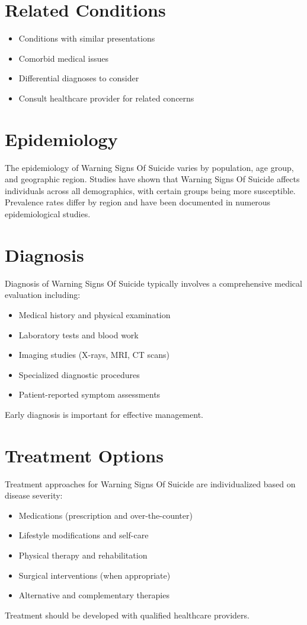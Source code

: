 \section*{Related Conditions}
\begin{itemize}
  \item Conditions with similar presentations
  \item Comorbid medical issues
  \item Differential diagnoses to consider
  \item Consult healthcare provider for related concerns
\end{itemize}

\section*{Epidemiology}
The epidemiology of Warning Signs Of Suicide varies by population, age group, and geographic region. Studies have shown that Warning Signs Of Suicide affects individuals across all demographics, with certain groups being more susceptible. Prevalence rates differ by region and have been documented in numerous epidemiological studies.

\section*{Diagnosis}
Diagnosis of Warning Signs Of Suicide typically involves a comprehensive medical evaluation including:
\begin{itemize}
  \item Medical history and physical examination
  \item Laboratory tests and blood work
  \item Imaging studies (X-rays, MRI, CT scans)
  \item Specialized diagnostic procedures
  \item Patient-reported symptom assessments
\end{itemize}
Early diagnosis is important for effective management.

\section*{Treatment Options}
Treatment approaches for Warning Signs Of Suicide are individualized based on disease severity:
\begin{itemize}
  \item Medications (prescription and over-the-counter)
  \item Lifestyle modifications and self-care
  \item Physical therapy and rehabilitation
  \item Surgical interventions (when appropriate)
  \item Alternative and complementary therapies
\end{itemize}
Treatment should be developed with qualified healthcare providers.


